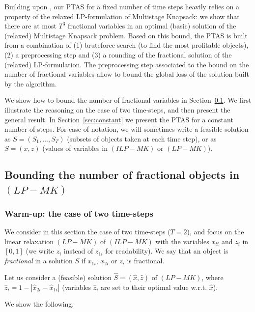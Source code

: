 \documentclass[a4paper]{book}
\begin{document}
Building upon \cite{Carpara}, our PTAS for a fixed number of time steps heavily relies on a property of the relaxed LP-formulation of {\sc Multistage  Knapsack}: we show that there are at most $T^3$ fractional variables in an optimal (basic) solution of the (relaxed) {\sc Multistage  Knapsack} problem.  Based on this bound, the PTAS is built from a combination of (1) bruteforce search (to find the most profitable objects), (2) a preprocessing step and (3) a rounding of the fractional solution of the (relaxed) LP-formulation. The preprocessing step associated to the bound on the number of fractional variables allow to bound the global loss of the solution built by the algorithm.


We show how to bound the number of fractional variables in Section~\ref{sec:frac}. We first illustrate the reasoning on the case of two time-steps, and then present the general result. In Section~\ref{sec:constant} we present the PTAS for a constant number of steps.  
For ease of notation, we will sometimes write a feasible solution as $S=(S_1,\dots,S_T)$ (subsets of objects taken at each time step), or as $S=(x,z)$ (values of variables in $(ILP-MK)$ or $(LP-MK)$).




\subsection{Bounding the number of fractional objects in $(LP-MK)$}\label{sec:frac}

\subsubsection{Warm-up: the case of two time-steps}



We consider in this section the case of two time-steps ($T=2$), and focus on the linear relaxation $(LP-MK)$ of $(ILP-MK)$ with the variables $x_{ti}$ and $z_i$ in $[0,1]$ (we write $z_i$ instead of $z_{1i}$ for readability). We say that an object is {\it fractional} in a solution $S$ if $x_{1i}$, $x_{2i}$ or $z_i$ is fractional. %

Let us consider a  (feasible) solution $\hat{S}=(\hat{x},\hat{z})$ of $(LP-MK)$, where $\hat{z}_{i}=1-|\hat{x}_{2i}-\hat{x}_{1i}|$ (variables $\hat{z}_{i}$ are set to their optimal value w.r.t. $\hat{x}$).  

We show the following.
\end{document}
